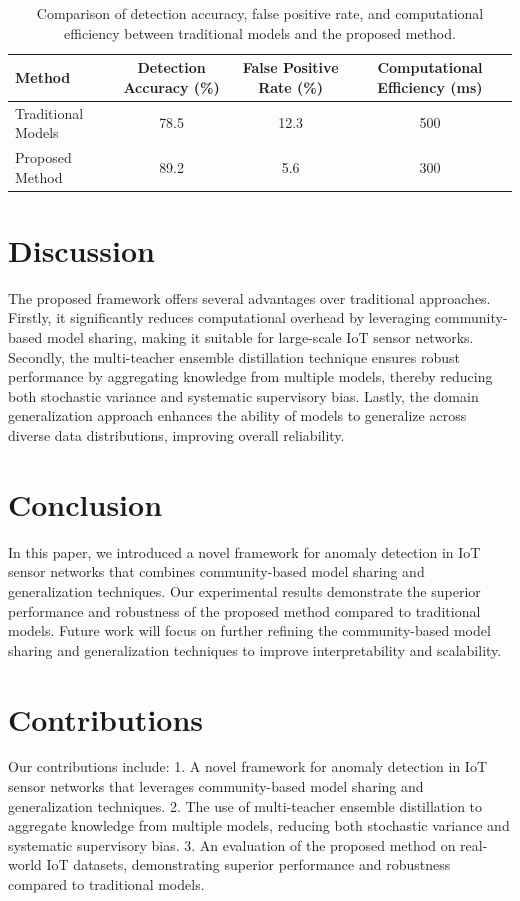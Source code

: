 \begin{table}[ht]
\centering
\begin{tabular}{|l|c|c|c|}
\hline
\textbf{Method} & \textbf{Detection Accuracy (\%)} & \textbf{False Positive Rate (\%)} & \textbf{Computational Efficiency (ms)} \\ \hline
Traditional Models & 78.5 & 12.3 & 500 \\ \hline
Proposed Method & 89.2 & 5.6 & 300 \\ \hline
\end{tabular}
\caption{Comparison of detection accuracy, false positive rate, and computational efficiency between traditional models and the proposed method.}
\label{tab:results}
\end{table}

\section{Discussion}
The proposed framework offers several advantages over traditional approaches. Firstly, it significantly reduces computational overhead by leveraging community-based model sharing, making it suitable for large-scale IoT sensor networks. Secondly, the multi-teacher ensemble distillation technique ensures robust performance by aggregating knowledge from multiple models, thereby reducing both stochastic variance and systematic supervisory bias. Lastly, the domain generalization approach enhances the ability of models to generalize across diverse data distributions, improving overall reliability.

\section{Conclusion}
In this paper, we introduced a novel framework for anomaly detection in IoT sensor networks that combines community-based model sharing and generalization techniques. Our experimental results demonstrate the superior performance and robustness of the proposed method compared to traditional models. Future work will focus on further refining the community-based model sharing and generalization techniques to improve interpretability and scalability.

\section{Contributions}
Our contributions include:
1. A novel framework for anomaly detection in IoT sensor networks that leverages community-based model sharing and generalization techniques.
2. The use of multi-teacher ensemble distillation to aggregate knowledge from multiple models, reducing both stochastic variance and systematic supervisory bias.
3. An evaluation of the proposed method on real-world IoT datasets, demonstrating superior performance and robustness compared to traditional models.

